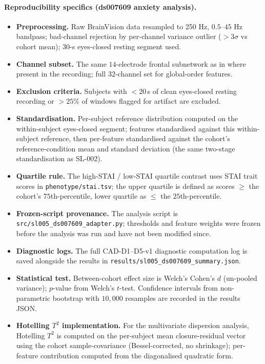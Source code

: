 \documentclass[11pt,a4paper]{article}
\begin{document}
\paragraph{Reproducibility specifics (ds007609 anxiety analysis).}
\begin{itemize}\itemsep0pt
\item \textbf{Preprocessing.} Raw BrainVision data resampled to 250 Hz, $0.5$--$45$ Hz bandpass; bad-channel rejection by per-channel variance outlier ($> 3\sigma$ vs cohort mean); 30-s eyes-closed resting segment used.
\item \textbf{Channel subset.} The same $14$-electrode frontal subnetwork as in \citet{SolutionLab002} where present in the recording; full $32$-channel set for global-order features.
\item \textbf{Exclusion criteria.} Subjects with $<\!20$\,s of clean eyes-closed resting recording or $>\!25\%$ of windows flagged for artifact are excluded.
\item \textbf{Standardisation.} Per-subject reference distribution computed on the within-subject eyes-closed segment; features standardised against this within-subject reference, then per-feature standardised against the cohort's reference-condition mean and standard deviation (the same two-stage standardisation as SL-002).
\item \textbf{Quartile rule.} The high-STAI / low-STAI quartile contrast uses STAI trait scores in \texttt{phenotype/stai.tsv}; the upper quartile is defined as scores $\geq$ the cohort's $75$th-percentile, lower quartile as $\leq$ the $25$th-percentile.
\item \textbf{Frozen-script provenance.} The analysis script is \texttt{src/sl005\_ds007609\_adapter.py}; thresholds and feature weights were frozen before the analysis was run and have not been modified since.
\item \textbf{Diagnostic logs.} The full CAD-D1--D5-v1 diagnostic computation log is saved alongside the results in \texttt{results/sl005\_ds007609\_summary.json}.
\item \textbf{Statistical test.} Between-cohort effect size is Welch's Cohen's $d$ (un-pooled variance); $p$-value from Welch's $t$-test. Confidence intervals from non-parametric bootstrap with $10{,}000$ resamples are recorded in the results JSON.
\item \textbf{Hotelling $T^2$ implementation.} For the multivariate dispersion analysis, Hotelling $T^2$ is computed on the per-subject mean closure-residual vector using the cohort sample-covariance (Bessel-corrected, no shrinkage); per-feature contribution computed from the diagonalised quadratic form.
\end{itemize}
\end{document}
